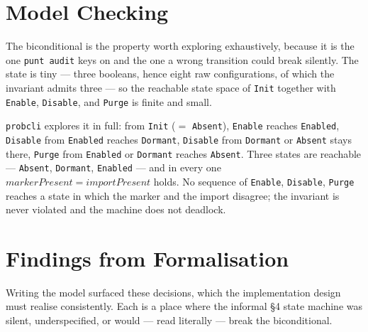 \documentclass[a4paper,10pt,fleqn]{article}
\begin{document}
\section{Model Checking}
\label{sec:modelcheck}

The biconditional is the property worth exploring exhaustively, because it is
the one \texttt{punt audit} keys on and the one a wrong transition could break
silently. The state is tiny --- three booleans, hence eight raw configurations,
of which the invariant admits three --- so the reachable state space of
\texttt{Init} together with \texttt{Enable}, \texttt{Disable}, and \texttt{Purge}
is finite and small.

\texttt{probcli} explores it in full: from \texttt{Init} ($=$ \texttt{Absent}),
\texttt{Enable} reaches \texttt{Enabled}, \texttt{Disable} from \texttt{Enabled}
reaches \texttt{Dormant}, \texttt{Disable} from \texttt{Dormant} or
\texttt{Absent} stays there, \texttt{Purge} from \texttt{Enabled} or
\texttt{Dormant} reaches \texttt{Absent}. Three states are reachable ---
\texttt{Absent}, \texttt{Dormant}, \texttt{Enabled} --- and in every one
$markerPresent = importPresent$ holds. No sequence of \texttt{Enable},
\texttt{Disable}, \texttt{Purge} reaches a state in which the marker and the
import disagree; the invariant is never violated and the machine does not
deadlock.

\section{Findings from Formalisation}
\label{sec:findings}

Writing the model surfaced these decisions, which the implementation design must
realise consistently. Each is a place where the informal \S4 state machine was
silent, underspecified, or would --- read literally --- break the biconditional.
\end{document}
